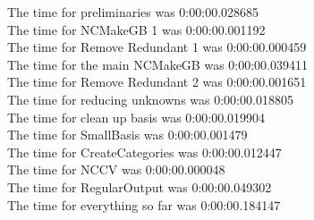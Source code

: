 \documentclass[rep10,leqno]{report}
\begin{document}
\noindent
The time for preliminaries was 0:00:00.028685\\
The time for NCMakeGB 1 was 0:00:00.001192\\
The time for Remove Redundant 1 was 0:00:00.000459\\
The time for the main NCMakeGB was 0:00:00.039411\\
The time for Remove Redundant 2 was 0:00:00.001651\\
The time for reducing unknowns was 0:00:00.018805\\
The time for clean up basis was 0:00:00.019904\\
The time for SmallBasis was 0:00:00.001479\\
The time for CreateCategories was 0:00:00.012447\\
The time for NCCV was 0:00:00.000048\\
The time for RegularOutput was 0:00:00.049302\\
The time for everything so far was 0:00:00.184147\\
\end{document}
